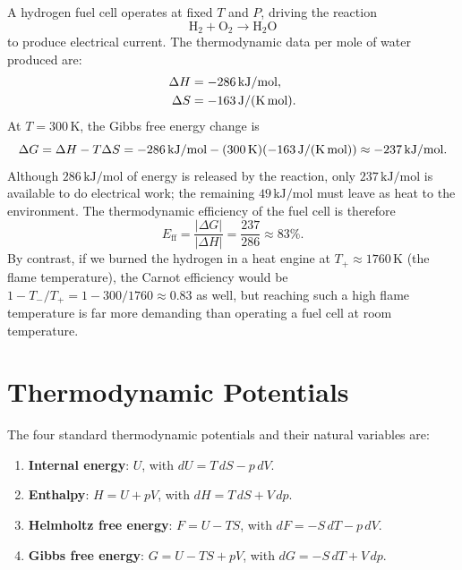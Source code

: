 A hydrogen fuel cell operates at fixed $T$ and $P$, driving the reaction
\begin{equation}
    \text{H}_2 + \text{O}_2 \to \text{H}_2\text{O}
\end{equation}
to produce electrical current. The thermodynamic data per mole of water produced are:
\begin{align}
    \Delta H &= -286\,\text{kJ/mol}, \\
    \Delta S &= -163\,\text{J/(K\,mol)}.
\end{align}
At $T = 300\,\text{K}$, the Gibbs free energy change is
\begin{equation}
    \Delta G = \Delta H - T\Delta S = -286\,\text{kJ/mol} - (300\,\text{K})(-163\,\text{J/(K\,mol)}) \approx -237\,\text{kJ/mol}.
\end{equation}
Although $286\,\text{kJ/mol}$ of energy is released by the reaction, only $237\,\text{kJ/mol}$ is available to do electrical work; the remaining $49\,\text{kJ/mol}$ must leave as heat to the environment. The thermodynamic efficiency of the fuel cell is therefore
\begin{equation}
    E_{\text{ff}} = \frac{|\Delta G|}{|\Delta H|} = \frac{237}{286} \approx 83\%.
\end{equation}
By contrast, if we burned the hydrogen in a heat engine at $T_+ \approx 1760\,\text{K}$ (the flame temperature), the Carnot efficiency would be $1 - T_-/T_+ = 1 - 300/1760 \approx 0.83$ as well, but reaching such a high flame temperature is far more demanding than operating a fuel cell at room temperature.

\section{Thermodynamic Potentials}

The four standard thermodynamic potentials and their natural variables are:

\begin{enumerate}
    \item \textbf{Internal energy}: $U$, with $dU = T\,dS - p\,dV$.
    \item \textbf{Enthalpy}: $H = U + pV$, with $dH = T\,dS + V\,dp$.
    \item \textbf{Helmholtz free energy}: $F = U - TS$, with $dF = -S\,dT - p\,dV$.
    \item \textbf{Gibbs free energy}: $G = U - TS + pV$, with $dG = -S\,dT + V\,dp$.
\end{enumerate}

